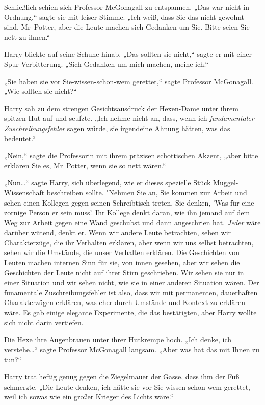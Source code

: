 {Schließlich schien sich Professor McGonagall zu entspannen. „Das war nicht in Ordnung,“ sagte sie mit leiser Stimme. „Ich weiß, dass Sie das nicht gewohnt sind, Mr~Potter, aber die Leute machen sich Gedanken um Sie. Bitte seien Sie nett zu ihnen.“

Harry blickte auf seine Schuhe hinab. „Das sollten sie nicht,“ sagte er mit einer Spur Verbitterung. „Sich Gedanken um mich machen, meine ich.“

„Sie haben sie vor Sie-wissen-schon-wem gerettet,“ sagte Professor McGonagall. „Wie sollten sie nicht?“

Harry sah zu dem strengen Gesichtsausdruck der Hexen-Dame unter ihrem spitzen Hut auf und seufzte. „Ich nehme nicht an, dass, wenn ich \emph{fundamentaler Zuschreibungsfehler} sagen würde, sie irgendeine Ahnung hätten, was das bedeutet.“

„Nein,“ sagte die Professorin mit ihrem präzisen schottischen Akzent, „aber bitte erklären Sie es, Mr~Potter, wenn sie so nett wären.“

„Nun…“ sagte Harry, sich überlegend, wie er dieses spezielle Stück Muggel-Wissenschaft beschreiben sollte. "Nehmen Sie an, Sie kommen zur Arbeit und sehen einen Kollegen gegen seinen Schreibtisch treten. Sie denken, 'Was für eine zornige Person er sein muss'. Ihr Kollege denkt daran, wie ihn jemand auf dem Weg zur Arbeit gegen eine Wand geschubst und dann angeschrien hat. \emph{Jeder} wäre darüber wütend, denkt er. Wenn wir andere Leute betrachten, sehen wir Charakterzüge, die ihr Verhalten erklären, aber wenn wir uns selbst betrachten, sehen wir die Umstände, die unser Verhalten erklären. Die Geschichten von Leuten machen internen Sinn für sie, von innen gesehen, aber wir sehen die Geschichten der Leute nicht auf ihrer Stirn geschrieben. Wir sehen sie nur in einer Situation und wir sehen nicht, wie sie in einer anderen Situation wären. Der funamentale Zuschreibungsfehler ist also, dass wir mit permanenten, dauerhaften Charakterzügen erklären, was eher durch Umstände und Kontext zu erklären wäre. Es gab einige elegante Experimente, die das bestätigten, aber Harry wollte sich nicht darin vertiefen.

Die Hexe ihre Augenbrauen unter ihrer Hutkrempe hoch. „Ich denke, ich verstehe…“ sagte Professor McGonagall langsam. „Aber was hat das mit Ihnen zu tun?“

Harry trat heftig genug gegen die Ziegelmauer der Gasse, dass ihm der Fuß schmerzte. „Die Leute denken, ich hätte sie vor Sie-wissen-schon-wem gerettet, weil ich sowas wie ein großer Krieger des Lichts wäre.“

}
